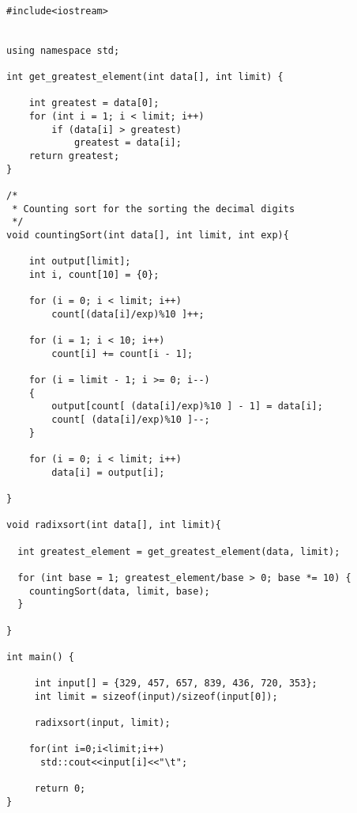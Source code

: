 \documentclass{article}
\begin{document}
\begin{verbatim}
  
#include<iostream> 


using namespace std; 

int get_greatest_element(int data[], int limit) {
  
	int greatest = data[0]; 
	for (int i = 1; i < limit; i++) 
		if (data[i] > greatest) 
			greatest = data[i];
	return greatest; 
} 

/*
 * Counting sort for the sorting the decimal digits
 */
void countingSort(int data[], int limit, int exp){
  
	int output[limit]; 
	int i, count[10] = {0}; 

	for (i = 0; i < limit; i++) 
		count[(data[i]/exp)%10 ]++; 

	for (i = 1; i < 10; i++) 
		count[i] += count[i - 1]; 

	for (i = limit - 1; i >= 0; i--) 
	{ 
		output[count[ (data[i]/exp)%10 ] - 1] = data[i]; 
		count[ (data[i]/exp)%10 ]--; 
	} 

	for (i = 0; i < limit; i++) 
		data[i] = output[i];
	
} 

void radixsort(int data[], int limit){ 

  int greatest_element = get_greatest_element(data, limit); 

  for (int base = 1; greatest_element/base > 0; base *= 10) {
    countingSort(data, limit, base);     
  }

} 

int main() {

     int input[] = {329, 457, 657, 839, 436, 720, 353};  
     int limit = sizeof(input)/sizeof(input[0]);
     
     radixsort(input, limit); 
  
    for(int i=0;i<limit;i++)
      std::cout<<input[i]<<"\t";
     
     return 0; 
} 
\end{verbatim}
\end{document}
